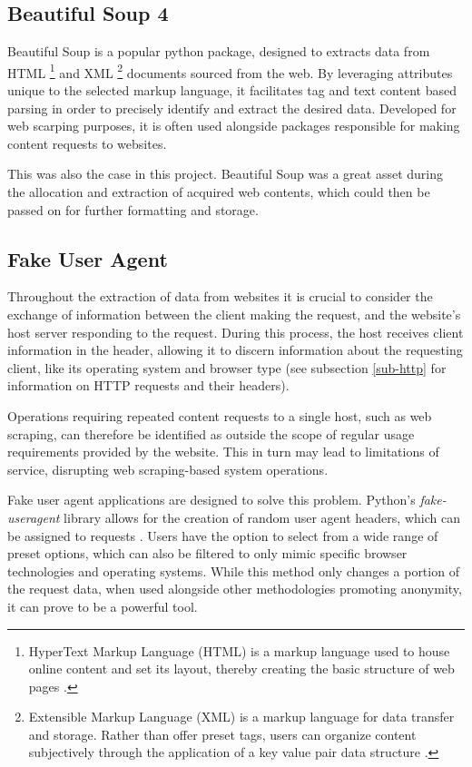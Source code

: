 \documentclass{thesis-ekf}
\theoremstyle{definition}
\theoremstyle{remark}
\begin{document}
{\subsection{Beautiful Soup 4}
Beautiful Soup \cite{bs4} is a popular python package, designed to extracts data from HTML 
  \footnote{HyperText Markup Language (HTML) is a markup language used to house online content and set its layout, thereby creating the basic structure of web pages \cite{mdn-html}.}
and XML 
  \footnote{Extensible Markup Language (XML) is a markup language for data transfer and storage.
  Rather than offer preset tags, users can organize content subjectively through the application of a key value pair data structure \cite{mdn-xml}.}
documents sourced from the web. By leveraging attributes unique to the selected markup language, it facilitates tag and text content based parsing in order to precisely identify and extract the desired data. Developed for web scarping purposes, it is often used alongside packages responsible for making content requests to websites. 

This was also the case in this project. Beautiful Soup was a great asset during the allocation and extraction of acquired web contents, which could then be passed on for further formatting and storage.

\subsection{Fake User Agent}
Throughout the extraction of data from websites it is crucial to consider the exchange of information between the client making the request, and the website's host server responding to the request. During this process, the host receives client information in the header, allowing it to discern information about the requesting client, like its operating system and browser type (see subsection \ref{sub-http} for information on HTTP requests and their headers).

Operations requiring repeated content requests to a single host, such as web scraping, can therefore be identified as outside the scope of regular usage requirements provided by the website. This in turn may lead to limitations of service, disrupting web scraping-based system operations.

Fake user agent applications are designed to solve this problem. Python's \emph{fake-useragent} library allows for the creation of random user agent headers, which can be assigned to requests \cite{fake-useragent}. Users have the option to select from a wide range of preset options, which can also be filtered to only mimic specific browser technologies and operating systems. While this method only changes a portion of the request data, when used alongside other methodologies promoting anonymity, it can prove to be a powerful tool.

}
\end{document}
